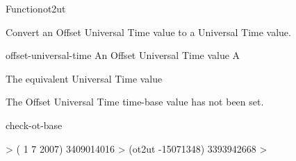 \documentclass[10pt,twoside,english,pdftex]{article}
\begin{document}
\begin{functiondoc}{Function}{ot2ut}{
  \returns{} }
%

\fnsyntax

\fnpurpose Convert an Offset Universal Time value to a Universal Time 
value.

\fnpackage {}

\fnmodule {}

\fnargs
\begin{args}{offset-universal-time}
 An Offset Universal Time value
 A 
\end{args}

\fnreturns The equivalent Universal Time value

\fnerrors The Offset Universal Time time-base value has not been set.

\begin{alsos}{check-ot-base}
\also[*ot-base*]
\also[ut2ot]
\end{alsos}

\fnexample
%
\W\supp
\begin{example}
  > ( 1 7 2007)
  3409014016
  > (ot2ut -15071348)
  3393942668
  >
\end{example}

\end{functiondoc}

\end{document}
